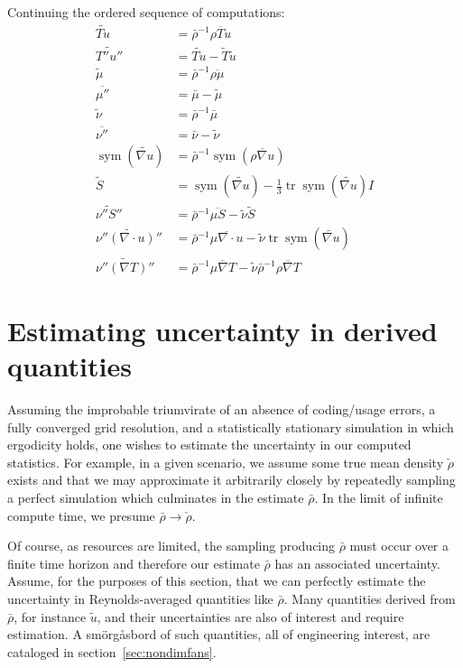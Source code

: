 \documentclass[letterpaper,11pt,nointlimits,reqno,draft]{amsbook}
\newcommand{\symmetricpart}[1]
  {\ensuremath{\operatorname{sym}\left(#1\right)}}
\DeclareMathOperator{\trace}{tr}
\begin{document}
Continuing the ordered sequence of computations:
{ \allowdisplaybreaks[1]
\begin{align}
  \widetilde{Tu} &= \bar{\rho}^{-1} \overline{\rho{}Tu}
\\
  \widetilde{T''u''} &= \widetilde{Tu} - \tilde{T}\tilde{u}
\\
  \tilde{\mu} &= \bar{\rho}^{-1} \overline{\rho\mu}
\\
  \overline{\mu''} &= \bar{\mu} - \tilde{\mu}
\\
  \tilde{\nu} &= \bar{\rho}^{-1} \bar{\mu}
\\
  \overline{\nu''} &= \bar{\nu} - \tilde{\nu}
\\
  \symmetricpart{\widetilde{\nabla{}u}}
  &= \bar{\rho}^{-1} \symmetricpart{\overline{\rho\nabla{}u}}
\\
  \tilde{S} &= \symmetricpart{\widetilde{\nabla{}u}}
   - \frac{1}{3} \trace\symmetricpart{\widetilde{\nabla{}u}} I
\\
  \widetilde{\nu''S''}
  &= \bar{\rho}^{-1} \overline{\mu{}S} - \tilde{\nu}\tilde{S}
\\
  \widetilde{\nu''\left(\nabla\cdot{}u\right)''}
  &= \bar{\rho}^{-1} \overline{\mu\nabla\cdot{}u}
   - \tilde{\nu}\trace\symmetricpart{\widetilde{\nabla{}u}}
\\
  \widetilde{\nu''\left(\nabla{}T\right)''}
  &= \bar{\rho}^{-1} \overline{\mu\nabla{}T}
   - \tilde{\nu} \bar{\rho}^{-1} \overline{\rho\nabla{}T}
\end{align}
}

\section{Estimating uncertainty in derived quantities}

Assuming the improbable triumvirate of an absence of coding/usage errors, a
fully converged grid resolution, and a statistically stationary simulation in
which ergodicity holds, one wishes to estimate the uncertainty in our computed
statistics.  For example, in a given scenario, we assume some true mean density
$\check{\rho}$ exists and that we may approximate it arbitrarily closely by
repeatedly sampling a perfect simulation which culminates in the estimate
$\bar{\rho}$.   In the limit of infinite compute time, we presume
$\bar{\rho}\to\check{\rho}$.

Of course, as resources are limited, the sampling producing $\bar{\rho}$ must
occur over a finite time horizon and therefore our estimate $\bar{\rho}$ has an
associated uncertainty.  Assume, for the purposes of this section, that we can
perfectly estimate the uncertainty in Reynolds-averaged quantities like
$\bar{\rho}$.  Many quantities derived from $\bar{\rho}$, for instance
$\tilde{u}$, and their uncertainties are also of interest and require
estimation.  A sm\"{o}rg\r{a}sbord of such quantities, all of engineering
interest, are cataloged in section~\ref{sec:nondimfans}.
\end{document}
